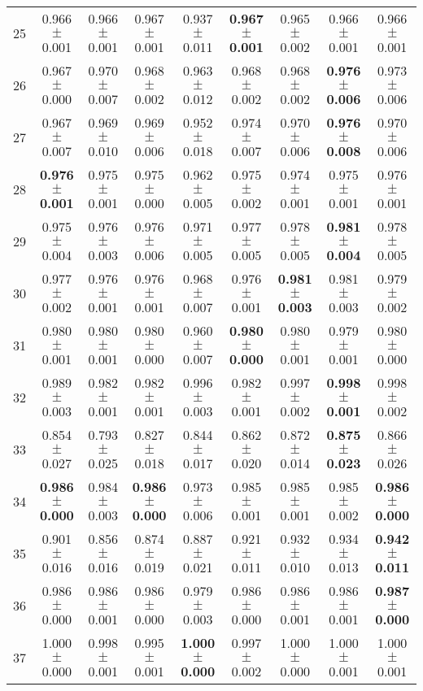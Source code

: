 \begin{table}[!ht]
{\begin{tabular}{r c c c c c c c c}
25 & 0.966 $\pm$ 0.001 & 0.966 $\pm$ 0.001 & 0.967 $\pm$ 0.001 & 0.937 $\pm$ 0.011 & \textbf{0.967 $\pm$ 0.001} & 0.965 $\pm$ 0.002 & 0.966 $\pm$ 0.001 & 0.966 $\pm$ 0.001 \\
26 & 0.967 $\pm$ 0.000 & 0.970 $\pm$ 0.007 & 0.968 $\pm$ 0.002 & 0.963 $\pm$ 0.012 & 0.968 $\pm$ 0.002 & 0.968 $\pm$ 0.002 & \textbf{0.976 $\pm$ 0.006} & 0.973 $\pm$ 0.006 \\
27 & 0.967 $\pm$ 0.007 & 0.969 $\pm$ 0.010 & 0.969 $\pm$ 0.006 & 0.952 $\pm$ 0.018 & 0.974 $\pm$ 0.007 & 0.970 $\pm$ 0.006 & \textbf{0.976 $\pm$ 0.008} & 0.970 $\pm$ 0.006 \\
28 & \textbf{0.976 $\pm$ 0.001} & 0.975 $\pm$ 0.001 & 0.975 $\pm$ 0.000 & 0.962 $\pm$ 0.005 & 0.975 $\pm$ 0.002 & 0.974 $\pm$ 0.001 & 0.975 $\pm$ 0.001 & 0.976 $\pm$ 0.001 \\
29 & 0.975 $\pm$ 0.004 & 0.976 $\pm$ 0.003 & 0.976 $\pm$ 0.006 & 0.971 $\pm$ 0.005 & 0.977 $\pm$ 0.005 & 0.978 $\pm$ 0.005 & \textbf{0.981 $\pm$ 0.004} & 0.978 $\pm$ 0.005 \\
30 & 0.977 $\pm$ 0.002 & 0.976 $\pm$ 0.001 & 0.976 $\pm$ 0.001 & 0.968 $\pm$ 0.007 & 0.976 $\pm$ 0.001 & \textbf{0.981 $\pm$ 0.003} & 0.981 $\pm$ 0.003 & 0.979 $\pm$ 0.002 \\
31 & 0.980 $\pm$ 0.001 & 0.980 $\pm$ 0.001 & 0.980 $\pm$ 0.000 & 0.960 $\pm$ 0.007 & \textbf{0.980 $\pm$ 0.000} & 0.980 $\pm$ 0.001 & 0.979 $\pm$ 0.001 & 0.980 $\pm$ 0.000 \\
32 & 0.989 $\pm$ 0.003 & 0.982 $\pm$ 0.001 & 0.982 $\pm$ 0.001 & 0.996 $\pm$ 0.003 & 0.982 $\pm$ 0.001 & 0.997 $\pm$ 0.002 & \textbf{0.998 $\pm$ 0.001} & 0.998 $\pm$ 0.002 \\
33 & 0.854 $\pm$ 0.027 & 0.793 $\pm$ 0.025 & 0.827 $\pm$ 0.018 & 0.844 $\pm$ 0.017 & 0.862 $\pm$ 0.020 & 0.872 $\pm$ 0.014 & \textbf{0.875 $\pm$ 0.023} & 0.866 $\pm$ 0.026 \\
34 & \textbf{0.986 $\pm$ 0.000} & 0.984 $\pm$ 0.003 & \textbf{0.986 $\pm$ 0.000} & 0.973 $\pm$ 0.006 & 0.985 $\pm$ 0.001 & 0.985 $\pm$ 0.001 & 0.985 $\pm$ 0.002 & \textbf{0.986 $\pm$ 0.000} \\
35 & 0.901 $\pm$ 0.016 & 0.856 $\pm$ 0.016 & 0.874 $\pm$ 0.019 & 0.887 $\pm$ 0.021 & 0.921 $\pm$ 0.011 & 0.932 $\pm$ 0.010 & 0.934 $\pm$ 0.013 & \textbf{0.942 $\pm$ 0.011} \\
36 & 0.986 $\pm$ 0.000 & 0.986 $\pm$ 0.001 & 0.986 $\pm$ 0.000 & 0.979 $\pm$ 0.003 & 0.986 $\pm$ 0.000 & 0.986 $\pm$ 0.001 & 0.986 $\pm$ 0.001 & \textbf{0.987 $\pm$ 0.000} \\
37 & 1.000 $\pm$ 0.000 & 0.998 $\pm$ 0.001 & 0.995 $\pm$ 0.001 & \textbf{1.000 $\pm$ 0.000} & 0.997 $\pm$ 0.002 & 1.000 $\pm$ 0.000 & 1.000 $\pm$ 0.001 & 1.000 $\pm$ 0.001 \\

\end{tabular}}
\end{table}
